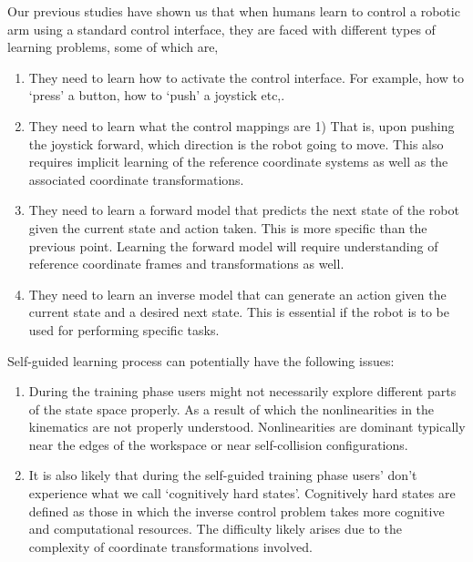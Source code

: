 \documentclass[12pt]{article}
\begin{document}
Our previous studies have shown us that when humans learn to control a robotic arm using a standard control interface, they are faced with different types of learning problems, some of which are,
\begin{enumerate}
	\item They need to learn how to activate the control interface. For example, how to `press' a button, how to `push' a joystick etc,.
	\item They need to learn what the control mappings are 1) That is, upon pushing the joystick forward, which direction is the robot going to move. This also requires implicit learning of the reference coordinate systems as well as the associated coordinate transformations. 
	\item They need to learn a forward model that predicts the next state of the robot given the current state and action taken. This is more specific than the previous point. Learning the forward model will require understanding of reference coordinate frames and transformations as well. 
	\item They need to learn an inverse model that can generate an action given the current state and a desired next state. This is essential if the robot is to be used for performing specific tasks. 
\end{enumerate}
Self-guided learning process can potentially have the following issues:
\begin{enumerate}
	\item During the training phase users might not necessarily explore different parts of the state space properly. As a result of which the nonlinearities in the kinematics are not properly understood. Nonlinearities are dominant typically near the edges of the workspace or near self-collision configurations. 
	\item It is also likely that during the self-guided training phase users' don't experience what we call `cognitively hard states'. Cognitively hard states are defined as those in which the inverse control problem takes more cognitive and computational resources. The difficulty likely arises due to the complexity of coordinate transformations involved. 
\end{enumerate}
\end{document}
